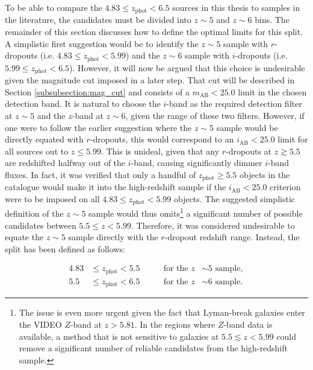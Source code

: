 To be able to compare the $4.83\leq z_{\mathrm{phot}}< 6.5$ sources in this thesis to samples in the literature, the candidates must be divided into $z\sim5$ and $z\sim6$ bins. The remainder of this section discusses how to define the optimal limits for this split. A simplistic first suggestion would be to identify the $z\sim5$ sample with $r$-dropouts (i.e. $4.83 \leq z_{\mathrm{phot}} < 5.99$) and the $z\sim6$ sample with $i$-dropouts (i.e. $5.99 \leq z_{\mathrm{phot}} < 6.5$). However, it will now be argued that this choice is undesirable given the magnitude cut imposed in a later step. That cut will be described in Section \ref{subsubsection:mag_cut} and consists of a $m_{\mathrm{AB}}< 25.0$ limit in the chosen detection band. It is natural to choose the $i$-band as the required detection filter at $z\sim5$ and the $z$-band at $z\sim6$, given the range of these two filters. However, if one were to follow the earlier suggestion where the $z\sim5$ sample would be directly equated with $r$-dropouts, this would correspond to an $i_{\mathrm{AB}}<25.0$ limit for all sources out to $z\leq5.99$. This is unideal, given that any $r$-dropouts at $z\gtrsim5.5$ are redshifted halfway out of the $i$-band, causing significantly dimmer $i$-band fluxes. In fact, it was verified that only a handful of $z_{\mathrm{phot}}\geq5.5$ objects in the catalogue would make it into the high-redshift sample if the $i_{\mathrm{AB}}< 25.0$ criterion were to be imposed on all $4.83\leq z_{\mathrm{phot}} <  5.99$ objects. The suggested simplistic definition of the $z\sim5$ sample would thus omits\footnote{The issue is even more urgent given the fact that Lyman-break galaxies enter the VIDEO $Z$-band at $z>5.81$. In the regions where $Z$-band data is available, a method that is not sensitive to galaxies at $5.5 \lesssim z <  5.99$ could remove a significant number of reliable candidates from the high-redshift sample.} a significant number of possible candidates between $5.5\leq z <  5.99$. Therefore, it was considered undesirable to equate the $z\sim5$ sample directly with the $r$-dropout redshift range. Instead, the split has been defined as follows:


\begin{equation}
\begin{alignedat}{3}
4.83 &\leq z_{\mathrm{phot}} <  5.5 \qquad &\text{for the } z &\sim 5 \text{ sample},\\
5.5 &\leq  z_{\mathrm{phot}} <  6.5 \qquad &\text{for the } z &\sim 6 \text{ sample}.
\end{alignedat}\label{eqn:redshift_sample}
\end{equation}

